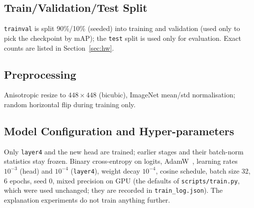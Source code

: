 \documentclass[11pt,a4paper]{article}
\begin{document}
\subsection{Train/Validation/Test Split}
\texttt{trainval} is split 90\%/10\% (seeded) into training and validation (used only to pick the checkpoint by mAP); the \texttt{test} split is used only for evaluation. Exact counts are listed in Section~\ref{sec:hw}.
\subsection{Preprocessing}
Anisotropic resize to $448\times448$ (bicubic), ImageNet mean/std normalisation; random horizontal flip during training only.
\subsection{Model Configuration and Hyper-parameters}
Only \texttt{layer4} and the new head are trained; earlier stages and their batch-norm statistics stay frozen. Binary cross-entropy on logits, AdamW~\citep{loshchilov2019}, learning rates $10^{-3}$ (head) and $10^{-4}$ (\texttt{layer4}), weight decay $10^{-4}$, cosine schedule, batch size 32, 6 epochs, seed 0, mixed precision on GPU (the defaults of \texttt{scripts/train.py}, which were used unchanged; they are recorded in \texttt{train\_log.json}). The explanation experiments do not train anything further.
\end{document}
